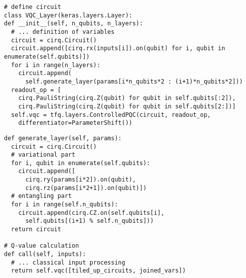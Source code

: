 \newsavebox\tqla\newsavebox\tqlb
\begin{lrbox}{\tqla}
\begin{minipage}{(\boxwidth-\hsep)/2}\lsttopcorr
\begin{lstlisting}
# define circuit
class VQC_Layer(keras.layers.Layer):
def __init__(self, n_qubits, n_layers):
  # ... definition of variables 
  circuit = cirq.Circuit()
  circuit.append([cirq.rx(inputs[i]).on(qubit) for i, qubit in enumerate(self.qubits)])
  for i in range(n_layers):
    circuit.append(
      self.generate_layer(params[i*n_qubits*2 : (i+1)*n_qubits*2]))
  readout_op = [
    cirq.PauliString(cirq.Z(qubit) for qubit in self.qubits[:2]),
    cirq.PauliString(cirq.Z(qubit) for qubit in self.qubits[2:])]
  self.vqc = tfq.layers.ControlledPQC(circuit, readout_op, 
    differentiator=ParameterShift())
\end{lstlisting}\vspace*{-1em}\end{minipage}
\end{lrbox}
\begin{lrbox}{\tqlb}
\begin{minipage}{(\boxwidth-\hsep)/2}\lsttopcorr
\begin{lstlisting}
def generate_layer(self, params):
  circuit = cirq.Circuit()
  # variational part
  for i, qubit in enumerate(self.qubits):
    circuit.append([
      cirq.ry(params[i*2]).on(qubit),
      cirq.rz(params[i*2+1]).on(qubit)])
  # entangling part
  for i in range(self.n_qubits):
    circuit.append(cirq.CZ.on(self.qubits[i], 
      self.qubits[(i+1) % self.n_qubits]))
  return circuit

# Q-value calculation
def call(self, inputs):
  # ... classical input processing
  return self.vqc([tiled_up_circuits, joined_vars])
\end{lstlisting}\vspace*{-1em}\end{minipage}
\end{lrbox}





